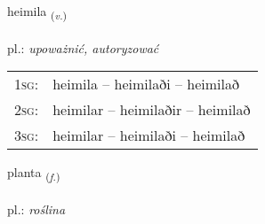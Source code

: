 \documentclass[frontgrid, backgrid]{flacards}\usepackage[]{graphicx}\usepackage[]{xcolor}
\begin{document}
\renewcommand{\flhead}{\vskip5pt \fboxsep=0pt {\small\bfseries\footnotesize Sagnorð | czasownik}}
\renewcommand{\fcfoot}{\vskip5pt \fboxsep=0pt \hspace{2pt}{\small\bfseries\footnotesize 3K}}

\renewcommand{\blhead}{\vskip5pt {\small\bfseries\footnotesize Sagnorð | czasownik }}
\renewcommand{\bcfoot}{\vskip5pt \hspace{2pt}{\small\bfseries\footnotesize 3K}}


{heimila \small{\textsubscript{(\textit{v.})}} \\[1ex] %
\textphonetic{[heiːmɪla]} \\
pl.: \emph{upoważnić, autoryzować} \\  [2ex]
\renewcommand*{\arraystretch}{0.8}
\begin{tabular}{p{1cm}l}
\textsc{1sg}: & heimila -- heimilaði -- heimilað \\ 
\textsc{2sg}: & heimilar -- heimilaðir -- heimilað \\ 
\textsc{3sg}: & heimilar -- heimilaði -- heimilað \\ 
\end{tabular}
}

\renewcommand{\flhead}{\vskip5pt \fboxsep=0pt {\small\bfseries\footnotesize Nafnorð | rzeczownik}}
\renewcommand{\fcfoot}{\vskip5pt \fboxsep=0pt \hspace{2pt}{\small\bfseries\footnotesize 3K}}

\renewcommand{\blhead}{\vskip5pt {\small\bfseries\footnotesize Nafnorð | rzeczownik }}
\renewcommand{\bcfoot}{\vskip5pt \hspace{2pt}{\small\bfseries\footnotesize 3K}}


{planta \small{\textsubscript{(\textit{f.})}} \\[1ex] %
\textphonetic{[pʰlan̥ta]} \\
pl.: \emph{roślina} \\  [2ex]
\renewcommand*{\arraystretch}{0.8}
}
\end{document}

